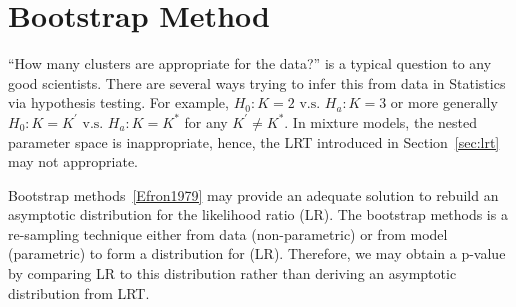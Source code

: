 \section{Bootstrap Method}
\label{sec:bootstrap}

``How many clusters are appropriate for the data?'' is a typical question
to any good scientists. There are several ways trying to infer this from
data in Statistics via hypothesis testing. For example,
$H_0: K = 2 \mbox{ v.s. } H_a: K = 3$ or more generally
$H_0: K = K^\prime \mbox{ v.s. } H_a: K = K^*$ for any $K^\prime \neq K^*$.
In mixture models, the nested parameter space is inappropriate, hence,
the LRT introduced in Section~\ref{sec:lrt} may not appropriate.

Bootstrap methods~\ref{Efron1979}
may provide an adequate solution to
rebuild an asymptotic distribution for the likelihood ratio (LR). The bootstrap
methods is a re-sampling technique either from data (non-parametric)
or from model (parametric) to form a distribution for (LR).
Therefore, we may obtain a p-value by comparing LR to this distribution
rather than deriving an asymptotic distribution from LRT.

